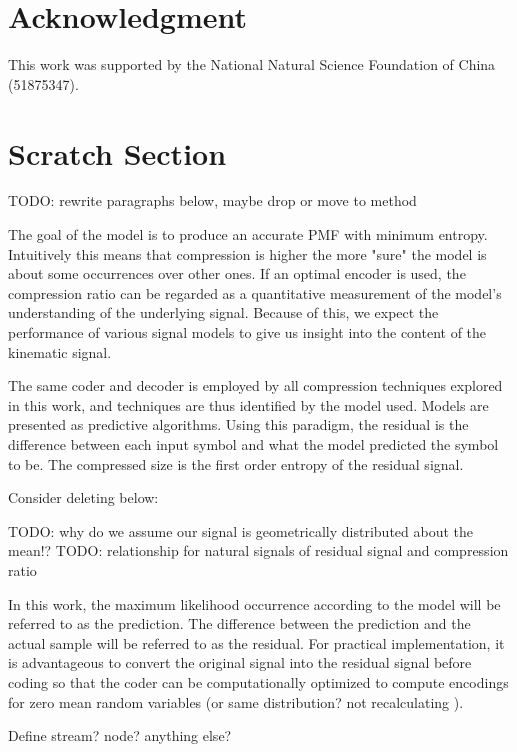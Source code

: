 \documentclass[journal]{IEEEtran}
\begin{document}
\section*{Acknowledgment}
This work was supported by the National Natural Science
Foundation of China (51875347).

{}


\clearpage
\section*{Scratch Section}
TODO: rewrite paragraphs below, maybe drop or move to method

The goal of the model is to produce an accurate PMF with minimum entropy. Intuitively this means that compression is higher the more "sure" the model is about some occurrences over other ones. If an optimal encoder is used, the compression ratio can be regarded as a quantitative measurement of the model's understanding of the underlying signal. Because of this, we expect the performance of various signal models to give us insight into the content of the kinematic signal.

The same coder and decoder is employed by all compression techniques explored in this work, and techniques are thus identified by the model used. Models are presented as predictive algorithms. Using this paradigm, the residual is the difference between each input symbol and what the model predicted the symbol to be. The compressed size is the first order entropy of the residual signal.


Consider deleting below:

TODO: why do we assume our signal is geometrically distributed about the mean!?
TODO: relationship for natural signals of residual signal and compression ratio

In this work, the maximum likelihood occurrence according to the model will be referred to as the prediction. The difference between the prediction and the actual sample will be referred to as the residual. For practical implementation, it is advantageous to convert the original signal into the residual signal before coding so that the coder can be computationally optimized to compute encodings for zero mean random variables (or same distribution? not recalculating ).

Define stream? node? anything else?
\end{document}

